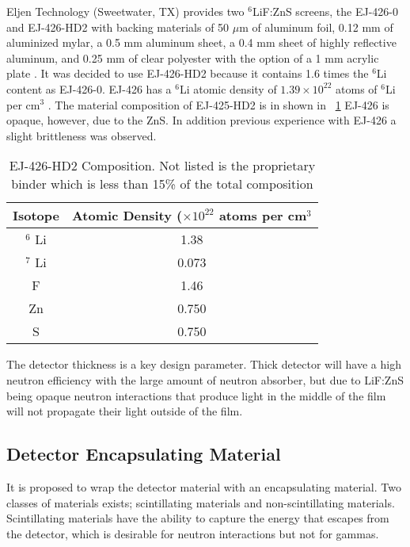 Eljen Technology (Sweetwater, TX) provides two ${}^6$LiF:ZnS screens, the EJ-426-0 and EJ-426-HD2 with backing materials   of 50 $\mu$m of aluminum foil, 0.12 mm of aluminized mylar, a 0.5 mm aluminum sheet, a 0.4 mm sheet of highly reflective aluminum, and 0.25 mm of clear polyester with the option of a 1 mm acrylic plate \cite{_ej-426_2012}.
It was decided to use EJ-426-HD2 because it contains 1.6 times the ${}^{6}$Li content as EJ-426-0. EJ-426 has a ${}^{6}$Li atomic density of $1.39\times10^{22}$ atoms of ${}^6$Li per cm${}^3$ \cite{eljen_ej-426_2012}. 
The material composition of EJ-425-HD2 is in shown in ~\ref{tab:EJ426Composition}
EJ-426 is opaque, however, due to the ZnS.  In addition previous experience with EJ-426 a slight brittleness was observed.
\begin{table}
    \centering
    \begin{tabular}{c|c}
        Isotope & Atomic Density ($\times 10^{22}$ atoms per cm${}^3$ \\
        \hline
        $ {}^6 $ Li & 1.38 \\
        $ {}^7 $ Li & 0.073 \\
        F & 1.46 \\
        Zn & 0.750 \\
        S & 0.750 \\
    \end{tabular}
    \label{tab:EJ426Composition}
    \caption{EJ-426-HD2 Composition.  Not listed is the proprietary binder which is less than 15\% of the total composition \cite{urffer_ej_2012}}
\end{table}
The detector thickness is a key design parameter. 
Thick detector will have a high neutron efficiency with the large amount of neutron absorber, but due to LiF:ZnS being opaque neutron interactions that produce light in the middle of the film will not propagate their light outside of the film.

\subsection{Detector Encapsulating Material}
It is proposed to wrap the detector material with an encapsulating material.
Two classes of materials exists; scintillating materials and non-scintillating materials.  
Scintillating materials have the ability to capture the energy that escapes from the detector, which is desirable for neutron interactions but not for gammas.

